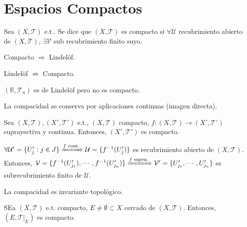 \chapter{Espacios Compactos}

\begin{defn}[Compacto]
  Sea $ ( X, \mathcal{T} )$ e.t.. Se dice que $(  X, \mathcal{T} )$ es compacto si $\forall \mathcal{U}$ recubrimiento abierto de $( X, \mathcal{T} )$, $\exists \mathcal{V}$ sub recubrimiento finito suyo.
\end{defn}

\begin{obs}
  Compacto $\Rightarrow$ Lindelöf.
\end{obs}

\begin{obs}
  Lindelöf $\not \Rightarrow$ Compacto.
\end{obs}

\begin{ejm}
  $( \mathbb{R}, \mathcal{T}_{u} )$ es de Lindelöf pero no es compacto.
\end{ejm}

\begin{obs}
  La compacidad se conserva por aplicaciones continuas (imagen directa).
\end{obs}

\begin{prop}
  Sea $( X, \mathcal{T} ), ( X', \mathcal{T}' )$ e.t., $( X, \mathcal{T} )$ compacto, $f : ( X, \mathcal{T} ) \to ( X', \mathcal{T}' )$ suprayectiva y continua. Entonces, $( X', \mathcal{T}' )$ es compacto.
\end{prop}

\begin{dem}
  $\forall \mathcal{U}' = \{  U_{j}' : j \in J \} \xRightarrow[]{ f \text{ cont.} } \mathcal{U} = \{ f^{-1}(U_{j}') \}$ es recubrimiento abierto de $( X, \mathcal{T} )$. Entonces, $\mathcal{V} = \{ f^{-1}(U'_{j_{1}}), \cdots, f^{-1}(U_{j_{n}}') \} \xRightarrow[]{ f \text{ supra.} } \mathcal{V}' = \{  U_{j_{1}}', \cdots, U_{j_{n}}' \}$ es subrecubrimiento finito de $\mathcal{U}$.
\end{dem}

\begin{cor}
  La compacidad es invariante topológico.
\end{cor}

\begin{prop}
  SEa $( X, \mathcal{T} )$ e.t. compacto, $E \neq \emptyset \subset X$ cerrado de $ ( X, \mathcal{T} )$. Entonces, $( E, \mathcal{T}|_{E})$ es compacto.
\end{prop}

